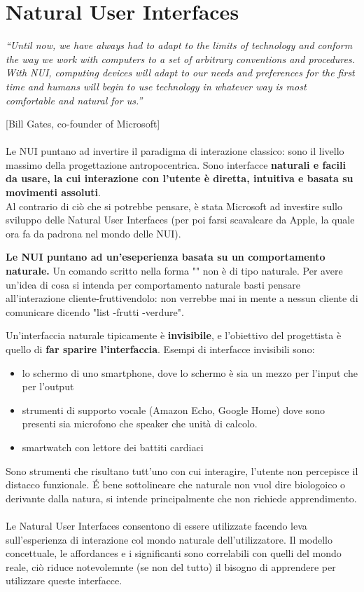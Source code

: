 \chapter{Natural User Interfaces}
\textit{“Until now, we have always had to adapt to the limits of technology and conform
the way we work with computers to a set of arbitrary conventions and procedures.
With NUI, computing devices will adapt to our needs and preferences for the first
time and humans will begin to use technology in whatever way is most
comfortable and natural for us.”} 

[Bill Gates, co-founder of Microsoft]
\\
\\Le NUI puntano ad invertire il paradigma di interazione classico: sono il livello massimo della progettazione antropocentrica. Sono interfacce \textbf{naturali e facili da usare, la cui interazione con l'utente è diretta, intuitiva e basata su movimenti assoluti}. \\
Al contrario di ciò che si potrebbe pensare, è stata Microsoft ad investire sullo sviluppo delle Natural User Interfaces (per poi farsi scavalcare da Apple, la quale ora fa da padrona nel mondo delle NUI).


\textbf{Le NUI puntano ad un'eseperienza basata su un comportamento naturale.}
Un comando scritto nella forma "" non è di tipo naturale. Per avere un'idea di cosa si intenda per comportamento naturale basti pensare all'interazione cliente-fruttivendolo: non verrebbe mai in mente a nessun cliente di comunicare dicendo "list -frutti -verdure". 


Un'interfaccia naturale tipicamente è \textbf{invisibile}, e l'obiettivo del progettista è quello di \textbf{far sparire l'interfaccia}. Esempi di interfacce invisibili sono: 
\begin{itemize}
\item lo schermo di uno smartphone, dove lo schermo è sia un mezzo per l'input che per l'output
\item strumenti di supporto vocale (Amazon Echo, Google Home) dove sono presenti sia microfono che speaker che unità di calcolo.
\item smartwatch con lettore dei battiti cardiaci
\end{itemize}

Sono strumenti che risultano tutt'uno con cui interagire, l'utente non percepisce il distacco funzionale.
É bene sottolineare che naturale non vuol dire biologoico o derivante dalla natura, si intende principalmente che non richiede apprendimento.
\\
\\Le Natural User Interfaces consentono di essere utilizzate facendo leva sull'esperienza di interazione col mondo naturale dell'utilizzatore. Il modello concettuale, le affordances e i significanti sono correlabili con quelli del mondo reale, ciò riduce notevolemnte (se non del tutto) il bisogno di apprendere per utilizzare queste interfacce.

